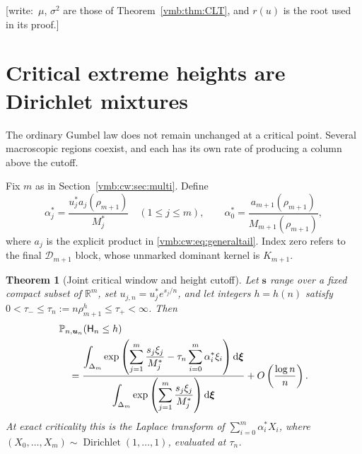 \documentclass[11pt,a4paper]{article}
\numberwithin{equation}{section}
\newtheorem{theorem}{Theorem}[section]
\theoremstyle{definition}\newtheorem{definition}[theorem]{Definition}
\theoremstyle{remark}\newtheorem{remark}[theorem]{Remark}
\newcommand{\Prob}{\mathbb P}
\newcommand{\dd}{\mathrm d}
\newcommand{\calD}{\mathcal D}
\DeclareMathOperator{\Dir}{Dirichlet}
\newcommand{\wrt}[1]{\textup{[}\textsf{write:}~#1\textup{]}}
\begin{document}
\wrt{$\mu$, $\sigma^2$ are those of Theorem~\ref{vmb:thm:CLT}, and $r(u)$ is
the root used in its proof.}

\section{Critical extreme heights are Dirichlet mixtures}
\label{vmb:cw:sec:mixed}
The ordinary Gumbel law does not remain unchanged at a critical point.
Several macroscopic regions coexist, and each has its own rate of producing
a column above the cutoff.

Fix $m$ as in Section~\ref{vmb:cw:sec:multi}. Define
\begin{equation}\label{vmb:cw:eq:alphas}
 \alpha_j^*=\frac{u_j^*a_j(\rho_{m+1})}{M_j^*}\quad(1\le j\le m),\qquad
 \alpha_0^*=\frac{a_{m+1}(\rho_{m+1})}{M_{m+1}(\rho_{m+1})},
\end{equation}
where $a_j$ is the explicit product in \eqref{vmb:cw:eq:generaltail}. Index zero
refers to the final $\calD_{m+1}$ block, whose unmarked dominant kernel is
$K_{m+1}$.

\begin{theorem}[Joint critical window and height cutoff]\label{vmb:cw:thm:mixed}
Let $\bm s$ range over a fixed compact subset of $\mathbb R^m$, set
$u_{j,n}=u_j^*e^{s_j/n}$, and let integers $h=h(n)$ satisfy
$0<\tau_-\le\tau_n:=n\rho_{m+1}^h\le \tau_+<\infty$. Then
\begin{align}\label{vmb:cw:eq:mixture}
 &\Prob_{n,\bm u_n}(\mathsf H_n\le h)\notag\\
 &\quad=
 \frac{\displaystyle\int_{\Delta_m}
  \exp\left(\sum_{j=1}^m\frac{s_j\xi_j}{M_j^*}
       -\tau_n\sum_{i=0}^m\alpha_i^*\xi_i\right)\dd\bm \xi}
 {\displaystyle\int_{\Delta_m}
  \exp\left(\sum_{j=1}^m\frac{s_j\xi_j}{M_j^*}\right)\dd\bm \xi}
 +O\left(\frac{\log n}{n}\right).
\end{align}
At exact criticality this is the Laplace transform of
$\sum_{i=0}^m\alpha_i^*X_i$, where
$(X_0,\ldots,X_m)\sim\Dir(1,\ldots,1)$, evaluated at $\tau_n$.
\end{theorem}
\end{document}
